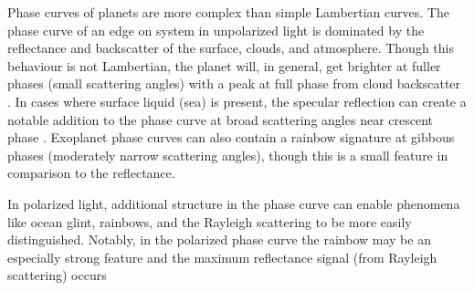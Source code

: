 \documentclass[
    usenatbib,
]{mnras}
\begin{document}



 Phase curves of planets are more complex than simple Lambertian curves.
 The phase curve of an edge on system in unpolarized light is dominated by the reflectance and backscatter of the surface, clouds, and atmosphere.
 Though this behaviour is not Lambertian, the planet will, in general, get brighter at fuller phases (small scattering angles) with a peak at full phase from cloud backscatter \citep[see, for example,][]{kopparla2018}.
 In cases where surface liquid (sea) is present, the specular reflection can create a notable addition to the phase curve at broad scattering angles near crescent phase \citep{Robinson_2010}.
 Exoplanet phase curves can also contain a rainbow signature at gibbous phases (moderately narrow scattering angles), though this is a small feature in comparison to the reflectance.

 In polarized light, additional structure in the phase curve can enable phenomena like ocean glint, rainbows, and the Rayleigh scattering to be more easily distinguished.  Notably, in the polarized phase curve the rainbow may be an especially strong feature and the maximum reflectance signal (from Rayleigh scattering) occurs 

 


\end{document}
